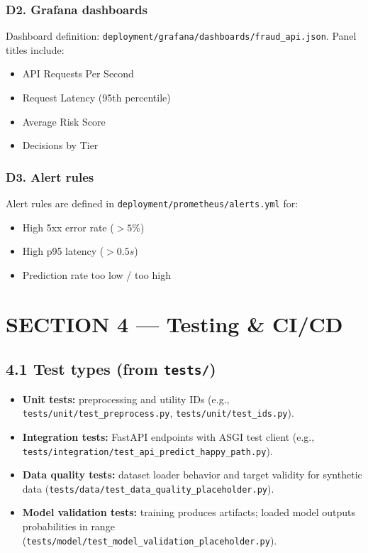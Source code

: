 \documentclass[11pt]{article}
\newcommand{\code}[1]{\texttt{#1}}
\begin{document}
\subsubsection*{D2. Grafana dashboards}
Dashboard definition: \code{deployment/grafana/dashboards/fraud\_api.json}. Panel titles include:
\begin{itemize}
  \item API Requests Per Second
  \item Request Latency (95th percentile)
  \item Average Risk Score
  \item Decisions by Tier
\end{itemize}

\subsubsection*{D3. Alert rules}
Alert rules are defined in \code{deployment/prometheus/alerts.yml} for:
\begin{itemize}
  \item High 5xx error rate (\(> 5\%\))
  \item High p95 latency (\(> 0.5s\))
  \item Prediction rate too low / too high
\end{itemize}

\section*{SECTION 4 — Testing \& CI/CD}

\subsection*{4.1 Test types (from \code{tests/})}
\begin{itemize}
  \item \textbf{Unit tests:} preprocessing and utility IDs (e.g., \code{tests/unit/test\_preprocess.py}, \code{tests/unit/test\_ids.py}).
  \item \textbf{Integration tests:} FastAPI endpoints with ASGI test client (e.g., \code{tests/integration/test\_api\_predict\_happy\_path.py}).
  \item \textbf{Data quality tests:} dataset loader behavior and target validity for synthetic data (\code{tests/data/test\_data\_quality\_placeholder.py}).
  \item \textbf{Model validation tests:} training produces artifacts; loaded model outputs probabilities in range (\code{tests/model/test\_model\_validation\_placeholder.py}).
\end{itemize}
\end{document}
